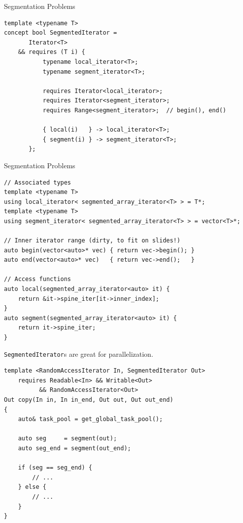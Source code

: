 \documentclass[aspectratio=169]{beamer}
\begin{document}

\begin{frame}[fragile]{Segmentation Problems}
  \small
\begin{lstlisting}
template <typename T>
concept bool SegmentedIterator =
       Iterator<T>
    && requires (T i) {
           typename local_iterator<T>;
           typename segment_iterator<T>;

           requires Iterator<local_iterator>;
           requires Iterator<segment_iterator>;
           requires Range<segment_iterator>;  // begin(), end()

           { local(i)   } -> local_iterator<T>;
           { segment(i) } -> segment_iterator<T>;
       };
\end{lstlisting}
\end{frame}


\begin{frame}[fragile]{Segmentation Problems}
  \footnotesize
\begin{lstlisting}
// Associated types
template <typename T>
using local_iterator< segmented_array_iterator<T> > = T*;
template <typename T>
using segment_iterator< segmented_array_iterator<T> > = vector<T>*;

// Inner iterator range (dirty, to fit on slides!)
auto begin(vector<auto>* vec) { return vec->begin(); }
auto end(vector<auto>* vec)   { return vec->end();   }

// Access functions
auto local(segmented_array_iterator<auto> it) {
    return &it->spine_iter[it->inner_index];
}
auto segment(segmented_array_iterator<auto> it) {
    return it->spine_iter;
}
\end{lstlisting}
\end{frame}


\begin{frame}[fragile]{\texttt{SegmentedIterator}s are great for
    parallelization.}
  \pause{}
  \footnotesize
\begin{lstlisting}
template <RandomAccessIterator In, SegmentedIterator Out>
    requires Readable<In> && Writable<Out>
          && RandomAccessIterator<Out>
Out copy(In in, In in_end, Out out, Out out_end)
{
    auto& task_pool = get_global_task_pool();

    auto seg     = segment(out);
    auto seg_end = segment(out_end);

    if (seg == seg_end) {
        // ...
    } else {
        // ...
    }
}
\end{lstlisting}
\end{frame}
\end{document}
